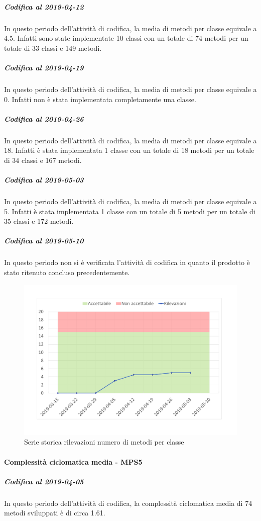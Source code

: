 \subparagraph{Codifica al 2019-04-12}
In questo periodo dell'attività di codifica, la media di metodi per classe equivale a 4.5. Infatti sono state implementate 10 classi con un totale di 74 metodi per un totale di 33 classi e 149 metodi.

\subparagraph{Codifica al 2019-04-19}
In questo periodo dell'attività di codifica, la media di metodi per classe equivale a 0. Infatti non è stata implementata completamente una classe.

\subparagraph{Codifica al 2019-04-26}
In questo periodo dell'attività di codifica, la media di metodi per classe equivale a 18. Infatti è stata implementata 1 classe con un totale di 18 metodi per un totale di 34 classi e 167 metodi.

\subparagraph{Codifica al 2019-05-03}
In questo periodo dell'attività di codifica, la media di metodi per classe equivale a 5. Infatti è stata implementata 1 classe con un totale di 5 metodi per un totale di 35 classi e 172 metodi.

\subparagraph{Codifica al 2019-05-10}
In questo periodo non si è verificata l'attività di codifica in quanto il prodotto è stato ritenuto concluso precedentemente.

\begin{figure}[H]
	\centering
	\includegraphics[scale=0.6]{images/resoconto/MPS4Chart.pdf}
	\caption{Serie storica rilevazioni numero di metodi per classe}	
\end{figure}

\paragraph{Complessità ciclomatica media - MPS5}
\subparagraph{Codifica al 2019-04-05}
In questo periodo dell'attività di codifica, la complessità ciclomatica media di 74 metodi sviluppati è di circa 1.61. 

